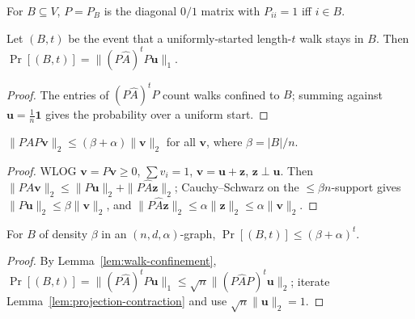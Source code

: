 \begin{definition}
  \label{def:projection}
  For $B\subseteq V$, $P=P_B$ is the diagonal $0/1$ matrix with $P_{ii}=1$ iff
  $i\in B$.
\end{definition}

\begin{lemma}
  \label{lem:walk-confinement}
  Let $(B,t)$ be the event that a uniformly-started length-$t$ walk stays in
  $B$. Then $\Pr[(B,t)]=\|(P\hat A)^tP\mathbf u\|_1$.
\end{lemma}
\begin{proof}
  The entries of $(P\hat A)^tP$ count walks confined to $B$; summing against
  $\mathbf u=\tfrac1n\mathbf 1$ gives the probability over a uniform start.
\end{proof}

\begin{lemma}
  \label{lem:projection-contraction}
  $\|P\hat A P\mathbf v\|_2\le(\beta+\alpha)\|\mathbf v\|_2$ for all $\mathbf v$,
  where $\beta=|B|/n$.
\end{lemma}
\begin{proof}
  WLOG $\mathbf v=P\mathbf v\ge0$, $\sum v_i=1$, $\mathbf v=\mathbf u+\mathbf z$,
  $\mathbf z\perp\mathbf u$. Then
  $\|P\hat A\mathbf v\|_2\le\|P\mathbf u\|_2+\|P\hat A\mathbf z\|_2$;
  Cauchy--Schwarz on the $\le\beta n$-support gives $\|P\mathbf u\|_2\le\beta\|
  \mathbf v\|_2$, and $\|P\hat A\mathbf z\|_2\le\alpha\|\mathbf z\|_2\le\alpha\|
  \mathbf v\|_2$.
\end{proof}

\begin{theorem}
  \label{thm:aks-confinement}
  For $B$ of density $\beta$ in an $(n,d,\alpha)$-graph,
  $\Pr[(B,t)]\le(\beta+\alpha)^t$.
\end{theorem}
\begin{proof}
  By Lemma~\ref{lem:walk-confinement},
  $\Pr[(B,t)]=\|(P\hat A)^tP\mathbf u\|_1\le\sqrt n\|(P\hat A P)^t\mathbf u\|_2$;
  iterate Lemma~\ref{lem:projection-contraction} and use $\sqrt n\|\mathbf
  u\|_2=1$.
\end{proof}

